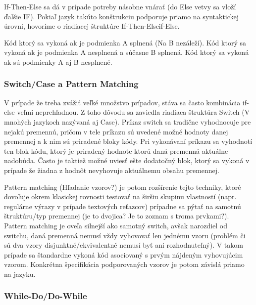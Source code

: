 \documentclass[a4paper,10pt]{article}
\begin{document}
\begin{multicols}{2}
		If-Then-Else sa dá v prípade potreby násobne vnárať (do Else vetvy sa vloží ďalšie IF). Pokiaľ jazyk takúto konštrukciu podporuje priamo na syntaktickej úrovni, hovoríme o riadiacej štruktúre If-Then-Elseif-Else.

		\begin{algorithm}
			\begin{algorithmic}[1]
					
					\State Kód ktorý sa vykoná ak je podmienka A splnená (Na B nezáleží).
					\State Kód ktorý sa vykoná ak je podmienka A nesplnená a súčasne B splnená.
				\Else
					\State Kód ktorý sa vykoná ak sú podmienky A aj B nesplnené.
				\EndIf				
			\end{algorithmic}	
		\end{algorithm}
		
	\subsubsection{Switch/Case a Pattern Matching}
	
		V prípade že treba zvážiť veľké množstvo prípadov, stáva sa často kombinácia if-else veľmi neprehľadnou. Z toho dôvodu sa zaviedla riadiaca štruktúra Switch (V mnohých jazykoch nazývaná aj Case).
Príkaz switch sa tradične vyhodnocuje pre nejakú premennú, pričom v tele príkazu sú uvedené možné hodnoty danej premennej a k nim sú priradené bloky kódy. Pri vykonávaní príkazu sa vyhodnotí ten blok kódu, ktorý je priradený hodnote ktorú daná premenná aktuálne nadobúda. Často je taktiež možné uviesť ešte dodatočný blok, ktorý sa vykoná v prípade že žiadna z hodnôt nevyhovuje aktuálnemu obsahu premennej.

		Pattern matching (Hľadanie vzorov?) je potom rozšírenie tejto techniky, ktoré dovoľuje okrem klasickej rovnosti testovať na širšiu skupinu vlastností (napr. regulárne výrazy v prípade textových reťazcov) prípadne sa pýtať na samotnú štruktúru/typ premennej (je to dvojica? Je to zoznam s troma prvkami?). Pattern matching je oveľa silnejší ako samotný switch, avšak narozdiel od switchu, daná premenná nemusí vždy vyhovovať len jednému vzoru (problém či sú dva vzory disjunktné/ekvivalentné nemusí byť ani rozhodnuteľný). V takom prípade sa štandardne vykoná kód asociovaný s prvým nájdeným vyhovujúcim vzorom. Konkrétna špecifikácia podporovaných vzorov je potom závislá priamo na jazyku. 
		
	\subsubsection{While-Do/Do-While}
	

\end{multicols}
\end{document}
